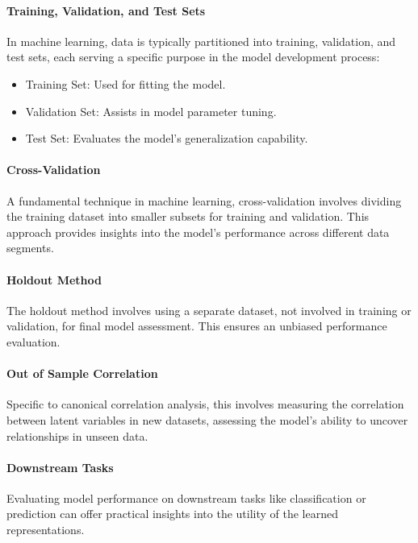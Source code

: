 \paragraph{Training, Validation, and Test Sets}

In machine learning, data is typically partitioned into training, validation, and test sets, each serving a specific purpose in the model development process:

\begin{itemize}
\item Training Set: Used for fitting the model.
\item Validation Set: Assists in model parameter tuning.
\item Test Set: Evaluates the model's generalization capability.
\end{itemize}

\paragraph{Cross-Validation}

A fundamental technique in machine learning, cross-validation involves dividing the training dataset into smaller subsets for training and validation. This approach provides insights into the model's performance across different data segments.

\paragraph{Holdout Method}

The holdout method involves using a separate dataset, not involved in training or validation, for final model assessment. This ensures an unbiased performance evaluation.

\paragraph{Out of Sample Correlation}

Specific to canonical correlation analysis, this involves measuring the correlation between latent variables in new datasets, assessing the model's ability to uncover relationships in unseen data.

\paragraph{Downstream Tasks}

Evaluating model performance on downstream tasks like classification or prediction can offer practical insights into the utility of the learned representations.

